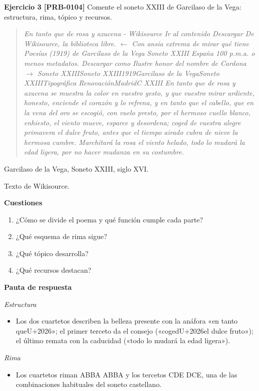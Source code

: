 \documentclass{book}
\begin{document}
\noindent\textbf{Ejercicio 3 [PRB-0104]}
Comente el soneto XXIII de Garcilaso de la Vega: estructura, rima, tópico y recursos.


\begin{quote}
\itshape En tanto que de rosa y azucena - Wikisource Ir al contenido Descargar De Wikisource, la biblioteca libre. \(\leftarrow\) Con ansia extrema de mirar qué tiene Poesías (1919) de Garcilaso de la Vega Soneto XXIII España 100 p.m.a. o menos metadatos. Descargar como Ilustre honor del nombre de Cardona \(\to\) Soneto XXIIISoneto XXIII1919Garcilaso de la VegaSoneto XXIIITipográfica RenovaciónMadridC XXIII En tanto que de rosa y azucena se muestra la color en vuestro gesto, y que vuestro mirar ardiente, honesto, enciende el corazón y lo refrena, y en tanto que el cabello, que en la vena del oro se escogió, con vuelo presto, por el hermoso cuello blanco, enhiesto, el viento mueve, esparce y desordena; coged de vuestra alegre primavera el dulce fruto, antes que el tiempo airado cubra de nieve la hermosa cumbre. Marchitará la rosa el viento helado, todo lo mudará la edad ligera, por no hacer mudanza en su costumbre.
\end{quote}
{\noindent\footnotesize Garcilaso de la Vega, Soneto XXIII, siglo XVI.\par}
{\noindent\footnotesize Texto de Wikisource.\par}

\noindent\textbf{Cuestiones}
\begin{enumerate}
\item ¿Cómo se divide el poema y qué función cumple cada parte?
\item ¿Qué esquema de rima sigue?
\item ¿Qué tópico desarrolla?
\item ¿Qué recursos destacan?
\end{enumerate}

\noindent\textbf{Pauta de respuesta}

\noindent\textit{Estructura}
\begin{itemize}
\item Los dos cuartetos describen la belleza presente con la anáfora «en tanto que{U+2026}»; el primer terceto da el consejo («coged{U+2026}el dulce fruto»); el último remata con la caducidad («todo lo mudará la edad ligera»).
\end{itemize}

\noindent\textit{Rima}
\begin{itemize}
\item Los cuartetos riman ABBA ABBA y los tercetos CDE DCE, una de las combinaciones habituales del soneto castellano.
\end{itemize}
\end{document}
